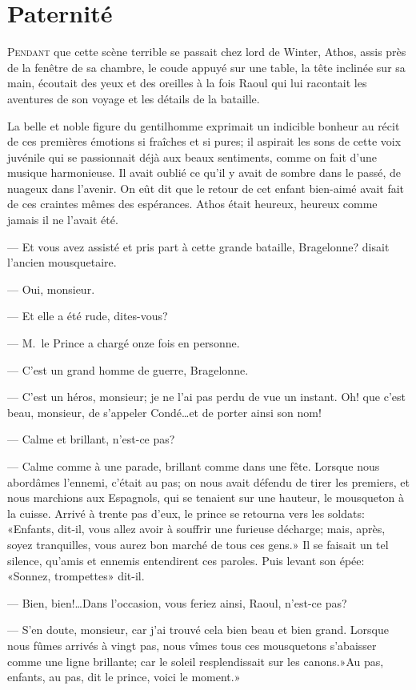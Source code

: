 \chapter{Paternité}

\lettrine{P}{endant} que cette scène terrible se passait chez lord de Winter, Athos, assis près de la fenêtre de sa chambre, le coude appuyé sur une table, la tête inclinée sur sa main, écoutait des yeux et des oreilles à la fois Raoul qui lui racontait les aventures de son voyage et les détails de la bataille.

La belle et noble figure du gentilhomme exprimait un indicible bonheur au récit de ces premières émotions si fraîches et si pures; il aspirait les sons de cette voix juvénile qui se passionnait déjà aux beaux sentiments, comme on fait d'une musique harmonieuse. Il avait oublié ce qu'il y avait de sombre dans le passé, de nuageux dans l'avenir. On eût dit que le retour de cet enfant bien-aimé avait fait de ces craintes mêmes des espérances. Athos était heureux, heureux comme jamais il ne l'avait été.

— Et vous avez assisté et pris part à cette grande bataille, Bragelonne? disait l'ancien mousquetaire.

— Oui, monsieur.

— Et elle a été rude, dites-vous?

— M.~le Prince a chargé onze fois en personne.

— C'est un grand homme de guerre, Bragelonne.

— C'est un héros, monsieur; je ne l'ai pas perdu de vue un instant. Oh! que c'est beau, monsieur, de s'appeler Condé\dots et de porter ainsi son nom!

— Calme et brillant, n'est-ce pas?

— Calme comme à une parade, brillant comme dans une fête. Lorsque nous abordâmes l'ennemi, c'était au pas; on nous avait défendu de tirer les premiers, et nous marchions aux Espagnols, qui se tenaient sur une hauteur, le mousqueton à la cuisse. Arrivé à trente pas d'eux, le prince se retourna vers les soldats: «Enfants, dit-il, vous allez avoir à souffrir une furieuse décharge; mais, après, soyez tranquilles, vous aurez bon marché de tous ces gens.» Il se faisait un tel silence, qu'amis et ennemis entendirent ces paroles. Puis levant son épée: «Sonnez, trompettes» dit-il.

— Bien, bien!\dots Dans l'occasion, vous feriez ainsi, Raoul, n'est-ce pas?

— S'en doute, monsieur, car j'ai trouvé cela bien beau et bien grand. Lorsque nous fûmes arrivés à vingt pas, nous vîmes tous ces mousquetons s'abaisser comme une ligne brillante; car le soleil resplendissait sur les canons.»Au pas, enfants, au pas, dit le prince, voici le moment.»

